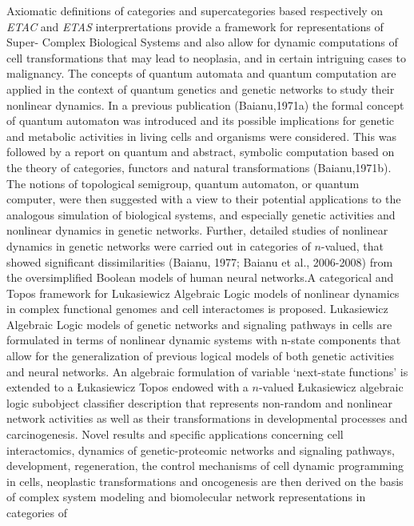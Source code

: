 \documentclass[12pt]{article}
\theoremstyle{plain}
\theoremstyle{definition}
\numberwithin{equation}{section}
\newcommand{\<}{{\langle}}
\begin{document}
Axiomatic definitions of categories and supercategories based respectively on \emph{ETAC} and \emph{ETAS} interprertations provide a framework for representations of Super- Complex Biological Systems and also allow for dynamic computations of cell transformations that may lead to neoplasia,  and in certain intriguing cases to malignancy. The concepts of quantum automata and quantum computation are applied in the context of quantum genetics and genetic networks to study their nonlinear dynamics. In a previous publication (Baianu,1971a) the formal concept of quantum automaton was introduced and its possible implications for genetic and metabolic activities in living cells and organisms were considered. This was followed by a report on quantum and abstract, symbolic computation based on the theory of categories, functors and natural transformations (Baianu,1971b). The notions of topological semigroup, quantum automaton, or quantum computer, were then suggested with a view to their potential applications to the analogous simulation of biological systems, and especially genetic activities and nonlinear dynamics in genetic networks. Further, detailed studies of nonlinear dynamics in genetic networks were carried out in 
categories of $n$-valued,  that showed significant dissimilarities (Baianu, 1977; Baianu et al., 2006-2008) from the oversimplified Boolean models of human neural networks.A categorical and Topos framework for Lukasiewicz Algebraic Logic models of nonlinear dynamics in complex functional genomes and cell interactomes is proposed. Lukasiewicz Algebraic Logic models of genetic networks and signaling pathways in cells are formulated in terms of nonlinear dynamic systems with n-state components that allow for the generalization of previous logical models of both genetic activities and neural networks. An algebraic formulation of variable `next-state functions' is extended to a \L{}ukasiewicz Topos endowed with a $n$-valued 
\L{}ukasiewicz algebraic logic subobject classifier description that represents non-random and nonlinear network activities as well as their transformations in developmental processes and carcinogenesis. Novel results and specific applications concerning cell interactomics, dynamics of genetic-proteomic networks and signaling pathways, development, regeneration, the control mechanisms of cell dynamic programming in cells, neoplastic transformations and oncogenesis are then derived on the basis of complex system modeling and biomolecular network representations in categories of 
\end{document}
